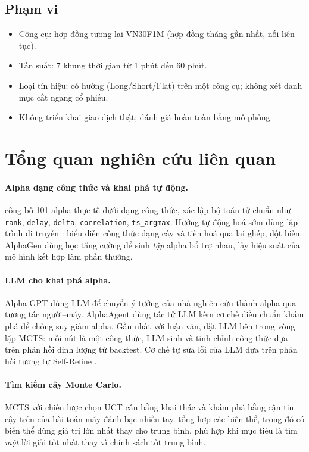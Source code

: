 \documentclass[12pt,a4paper]{article}
\newcommand{\code}[1]{\texttt{#1}}
\begin{document}
\subsection{Phạm vi}
\begin{itemize}
  \item Công cụ: hợp đồng tương lai VN30F1M (hợp đồng tháng gần nhất, nối liên tục).
  \item Tần suất: 7 khung thời gian từ 1 phút đến 60 phút.
  \item Loại tín hiệu: có hướng (Long/Short/Flat) trên một công cụ; không xét danh mục cắt ngang cổ phiếu.
  \item Không triển khai giao dịch thật; đánh giá hoàn toàn bằng mô phỏng.
\end{itemize}

\section{Tổng quan nghiên cứu liên quan}

\paragraph{Alpha dạng công thức và khai phá tự động.}
\citet{kakushadze2016alphas} công bố 101 alpha thực tế dưới dạng công thức, xác lập bộ toán tử chuẩn như \code{rank}, \code{delay}, \code{delta}, \code{correlation}, \code{ts\_argmax}. Hướng tự động hoá sớm dùng lập trình di truyền \citep{koza1992gp}: biểu diễn công thức dạng cây và tiến hoá qua lai ghép, đột biến. AlphaGen \citep{yu2023alphagen} dùng học tăng cường để sinh \emph{tập} alpha bổ trợ nhau, lấy hiệu suất của mô hình kết hợp làm phần thưởng.

\paragraph{LLM cho khai phá alpha.}
Alpha-GPT \citep{wang2023alphagpt} dùng LLM để chuyển ý tưởng của nhà nghiên cứu thành alpha qua tương tác người–máy. AlphaAgent \citep{tang2025alphaagent} dùng tác tử LLM kèm cơ chế điều chuẩn khám phá để chống suy giảm alpha. Gần nhất với luận văn, \citet{shi2026alphajungle} đặt LLM bên trong vòng lặp MCTS: mỗi nút là một công thức, LLM sinh và tinh chỉnh công thức dựa trên phản hồi định lượng từ backtest. Cơ chế tự sửa lỗi của LLM dựa trên phản hồi tương tự Self-Refine \citep{madaan2023selfrefine}.

\paragraph{Tìm kiếm cây Monte Carlo.}
MCTS với chiến lược chọn UCT \citep{kocsis2006uct} cân bằng khai thác và khám phá bằng cận tin cậy trên của bài toán máy đánh bạc nhiều tay. \citet{browne2012mcts} tổng hợp các biến thể, trong đó có biến thể dùng giá trị lớn nhất thay cho trung bình, phù hợp khi mục tiêu là tìm \emph{một} lời giải tốt nhất thay vì chính sách tốt trung bình.
\end{document}
